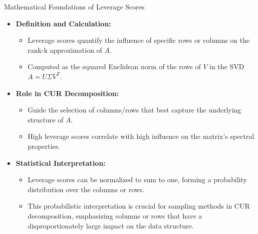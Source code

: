 \documentclass[pdf]{beamer}
\begin{document}
\begin{frame}{Mathematical Foundations of Leverage Scores}
    \begin{itemize}
        \item \textbf{Definition and Calculation:}
            \begin{itemize}
                \item Leverage scores quantify the influence of specific rows or columns on the rank-k approximation of \( A \).
                \item Computed as the squared Euclidean norm of the rows of \( V \) in the SVD \( A = U \Sigma V^T \).
            \end{itemize}
        \item \textbf{Role in CUR Decomposition:}
            \begin{itemize}
                \item Guide the selection of columns/rows that best capture the underlying structure of \( A \).
                \item High leverage scores correlate with high influence on the matrix's spectral properties.
            \end{itemize}
        \item \textbf{Statistical Interpretation:}
            \begin{itemize}
                \item Leverage scores can be normalized to sum to one, forming a probability distribution over the columns or rows.
                \item This probabilistic interpretation is crucial for sampling methods in CUR decomposition, emphasizing columns or rows that have a disproportionately large impact on the data structure.
            \end{itemize}
    \end{itemize}
\end{frame}
 
\end{document}

